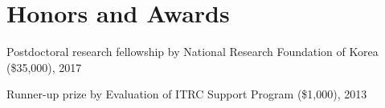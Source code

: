 \section*{Honors and Awards}
\begin{description}
\item Postdoctoral research fellowship by
  National Research Foundation of Korea (\$35,000), 2017

\item Runner-up prize by
  Evaluation of ITRC Support Program (\$1,000), 2013

\end{description}
